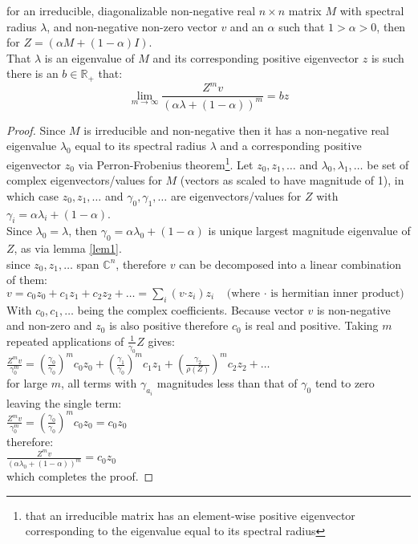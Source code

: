 \begin{Theorem}\label{th:0}
for an irreducible, diagonalizable non-negative real $n\times n$ matrix $M$ with spectral radius $\lambda$, and non-negative non-zero vector $v$ and an $\alpha$ such that $1>\alpha>0$, then for $Z=(\alpha M+(1-\alpha)I)$.\\
That $\lambda$ is an eigenvalue of $M$ and its corresponding positive eigenvector $z$ is such there is an $b\in \mathbb{R_+}$ that: $$\lim_{m\rightarrow\infty}\frac{Z^mv}{(\alpha\lambda+(1-\alpha))^m}=bz$$
\end{Theorem}
\begin{proof}
Since $M$ is irreducible and non-negative then it has a non-negative real eigenvalue $\lambda_0$ equal to its spectral radius $\lambda$ and a corresponding positive eigenvector $z_0$ via Perron-Frobenius theorem\footnote{that an irreducible matrix has an element-wise positive eigenvector corresponding to the eigenvalue equal to its spectral radius}.
Let $z_0,z_1,\dots$ and $\lambda_0,\lambda_1,\dots$ be set of complex eigenvectors/values for $M$ (vectors as scaled to have magnitude of 1), in which case $z_0,z_1,\dots$ and $\gamma_0,\gamma_1,\dots$ are eigenvectors/values for $Z$ with $\gamma_i=\alpha\lambda_i+(1-\alpha)$.\\
Since $\lambda_0=\lambda$, then $\gamma_0=\alpha\lambda_0+(1-\alpha)$ is unique largest magnitude eigenvalue of $Z$, as via lemma \ref{lem1}.\\
since $z_0,z_1,\dots$ span $\mathbb{C}^n$, therefore $v$ can be decomposed into a linear combination of them:\\
$v = c_0z_0 + c_1z_1 + c_2z_2 +\dots = \sum_i(v\boldsymbol{\cdot}z_i)z_i~~~~~\text{(where $\boldsymbol{\cdot}$ is hermitian inner product)}$\\
With $c_0,c_1,\dots$ being the complex coefficients. Because vector $v$ is non-negative and non-zero and $z_0$ is also positive therefore $c_0$ is real and positive.
Taking $m$ repeated applications of $\frac{1}{\gamma_0}Z$ gives:\\
$\frac{Z^mv}{\gamma_0^m} = \left(\frac{\gamma_0}{\gamma_0}\right)^mc_0z_0 + \left(\frac{\gamma_{1}}{\gamma_0}\right)^mc_1z_1 + \left(\frac{\gamma_{2}}{\rho(Z)}\right)^mc_2z_2 + \dots$\\
for large $m$, all terms with $\gamma_{a_i}$ magnitudes less than that of $\gamma_0$ tend to zero leaving the single term:\\
$\frac{Z^mv}{\gamma_0^m} = \left(\frac{\gamma_0}{\gamma_0}\right)^mc_0z_0=c_0z_0$\\
therefore:\\
$\frac{Z^mv}{(\alpha\lambda_0+(1-\alpha))^m} = c_0z_0$\\
which completes the proof.
\end{proof}


